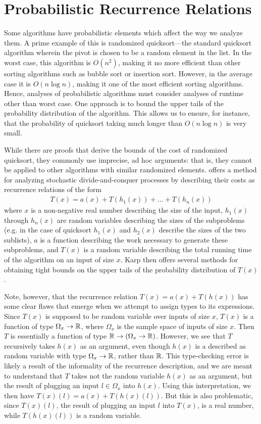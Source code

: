 \section{Probabilistic Recurrence Relations}

Some algorithms have probabilistic elements which affect the way we analyze them. A prime example of this is randomized 
quicksort---the standard quicksort algorithm wherein the pivot is chosen to be a random element in the list. In the worst case,
this algorithm is $O(n^2)$, making it no more efficient than other sorting algorithms such as bubble sort or insertion sort. 
However, in the average case it is $O(n\log n)$, making it one of the most efficient sorting algorithms. Hence, analyses of probabilistic algorithms must consider analyses of runtime other than worst case. One approach is to bound the upper
tails of the probability distribution of the algorithm. This allows us to ensure, for instance, that the probability of 
quicksort taking much longer than $O(n \log n)$ is very small. 

While there are proofs that derive the bounds of the cost of randomized quicksort, they commonly use
imprecise, ad hoc arguments: that is, they cannot be applied to other algorithms with similar randomized elements. 
\cite{Karp} offers a method for analyzing stochastic divide-and-conquer processes by describing their costs as recurrence relations of the form
\begin{align*}
T(x) = a(x) + T(h_1(x)) + \dots + T(h_n(x))
\end{align*}
where $x$ is a non-negative real number describing the size of the input, $h_1(x)$ through $h_n(x)$ are random 
variables describing the sizes of the subproblems (e.g. in the case of quicksort $h_1(x)$ and $h_2(x)$ describe the sizes 
of the two sublists), $a$ is a function describing the work necessary to generate these subproblems, and $T(x)$ is a 
random variable describing the total running time of the algorithm on an input of size $x$. Karp then offers several methods 
for obtaining tight bounds on the upper tails of the probability distribution of $T(x)$. 

Note, however, that the recurrence relation $T(x) = a(x) + T(h(x))$ has some clear flaws that 
emerge when we attempt to assign types to its expressions. Since $T(x)$ is supposed to be random
variable over inputs of size $x$, $T(x)$ is a function of type 
$\Omega_x \rightarrow \mathbb{R}$, where $\Omega_x$ is the sample space of inputs of size $x$. Then $T$ is essentially a 
function of type $\mathbb{R} \rightarrow (\Omega_x \rightarrow \mathbb{R})$. However, we see that $T$ recursively takes 
$h(x)$ as an argument, even though $h(x)$ is a described as random variable with type $\Omega_x \rightarrow \mathbb{R}$, 
rather than $\mathbb{R}$. This type-checking error is likely a result of the informality of the recurrence description, 
and we are meant to understand that $T$ takes not the 
random variable $h(x)$ as an argument, but the result of plugging an input $l \in \Omega_x$ into $h(x)$. Using this 
interpretation, we then have $T(x)(l) = a(x) + T(h(x)(l))$. But this is also problematic, since $T(x)(l)$, the result 
of plugging an input $l$ into $T(x)$, is a real number, while $T(h(x)(l))$ is a random variable. 

